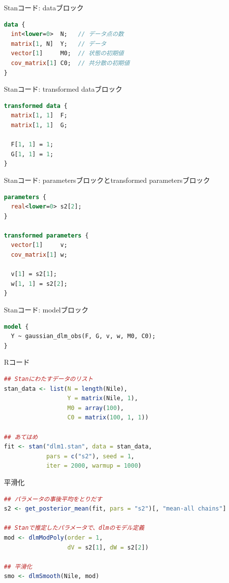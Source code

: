 \documentclass[dvipdfmx,12pt]{beamer}
\begin{document}
\begin{frame}[fragile]{Stanコード: dataブロック}
  \begin{lstlisting}[language=Stan]
data {
  int<lower=0>  N;   // データ点の数
  matrix[1, N]  Y;   // データ
  vector[1]     M0;  // 状態の初期値
  cov_matrix[1] C0;  // 共分散の初期値
}
  \end{lstlisting}
\end{frame}

\begin{frame}[fragile]{Stanコード: transformed dataブロック}
  \begin{lstlisting}[language=Stan]
transformed data {
  matrix[1, 1]  F;
  matrix[1, 1]  G;

  F[1, 1] = 1;
  G[1, 1] = 1;
}
  \end{lstlisting}
\end{frame}

\begin{frame}[fragile]{Stanコード: parametersブロックとtransformed parametersブロック}
  \begin{lstlisting}[language=Stan]
parameters {
  real<lower=0> s2[2];
}

transformed parameters {
  vector[1]     v;
  cov_matrix[1] w;

  v[1] = s2[1];
  w[1, 1] = s2[2];
}
  \end{lstlisting}
\end{frame}

\begin{frame}[fragile]{Stanコード: modelブロック}
  \begin{lstlisting}[language=Stan]
model {
  Y ~ gaussian_dlm_obs(F, G, v, w, M0, C0);
}
  \end{lstlisting}
\end{frame}

\begin{frame}[fragile]{Rコード}
  \begin{lstlisting}[language=R]
## Stanにわたすデータのリスト
stan_data <- list(N = length(Nile),
                  Y = matrix(Nile, 1),
                  M0 = array(100),
                  C0 = matrix(100, 1, 1))

## あてはめ
fit <- stan("dlm1.stan", data = stan_data,
            pars = c("s2"), seed = 1,
            iter = 2000, warmup = 1000)
  \end{lstlisting}
\end{frame}

\begin{frame}[fragile]{平滑化}
  \begin{lstlisting}[language=R]
## パラメータの事後平均をとりだす
s2 <- get_posterior_mean(fit, pars = "s2")[, "mean-all chains"]

## Stanで推定したパラメータで、dlmのモデル定義
mod <- dlmModPoly(order = 1,
                  dV = s2[1], dW = s2[2])

## 平滑化
smo <- dlmSmooth(Nile, mod)
  \end{lstlisting}
\end{frame}
\end{document}
